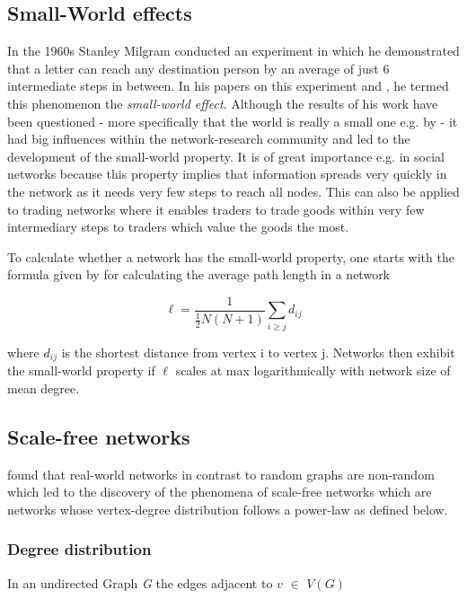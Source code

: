 \documentclass[../Bachelorarbeit.tex]{subfiles}
\begin{document}
\subsection{Small-World effects}
In the 1960s Stanley Milgram conducted an experiment in which he demonstrated that a letter can reach any destination person by an average of just 6 intermediate steps in between. In his papers on this experiment \cite{TraverMilgram_StudySmallWorld} and \cite{Milgram_SmallWorld}, he termed this phenomenon the \textit{small-world effect}. Although the results of his work have been questioned - more specifically that the world is really a small one e.g. by \cite{Kleinfeld_BigWorld} - it had big influences within the network-research community and led to the development of the small-world property. It is of great importance e.g. in social networks because this property implies that information spreads very quickly in the network as it needs very few steps to reach all nodes. This can also be applied to trading networks where it enables traders to trade goods within very few intermediary steps to traders which value the goods the most.

\medskip

To calculate whether a network has the small-world property, one starts with the formula given by \cite{Newman_ComplexNetworks} for calculating the average path length in a network

\begin{equation}
\ell = \frac{1}{\frac{1}{2}N(N+1)} \displaystyle\sum_{i \geq j }^{} d_{ij}
\end{equation}

where $d_{ij}$ is the shortest distance from vertex i to vertex j. Networks then exhibit the small-world property if $\ell$ scales at max logarithmically with network size of mean degree.

\subsection{Scale-free networks}
\cite{BarabasiAlbert_EmergenceScaling} found that real-world networks in contrast to random graphs are non-random which led to the discovery of the phenomena of scale-free networks which are networks whose vertex-degree distribution follows a power-law as defined below.

\subsubsection{Degree distribution}
In an undirected Graph \textit{G} the edges adjacent to $v$ $\in$ $V(G)$ 
\end{document}
